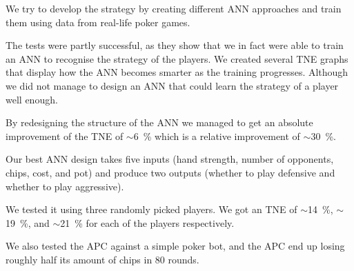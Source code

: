 We try to develop the strategy by creating different ANN approaches and train them using data from real-life poker games.

The tests were partly successful, as they show that we in fact were able to train an ANN to recognise the strategy of the players. We created several TNE graphs that display how the ANN becomes smarter as the training progresses. Although we did not manage to design an ANN that could learn the strategy of a player well enough.

By redesigning the structure of the ANN we managed to get an absolute improvement of the TNE of $\sim$6~\% which is a relative improvement of $\sim$30~\%.

Our best ANN design takes five inputs (hand strength, number of opponents, chips, cost, and pot) and produce two outputs (whether to play defensive and whether to play aggressive). 

We tested it using three randomly picked players. We got an TNE of $\sim$14~\%, $\sim$19~\%, and $\sim$21~\% for each of the players respectively.

We also tested the APC against a simple poker bot, and the APC end up losing roughly half its amount of chips in 80 rounds.
